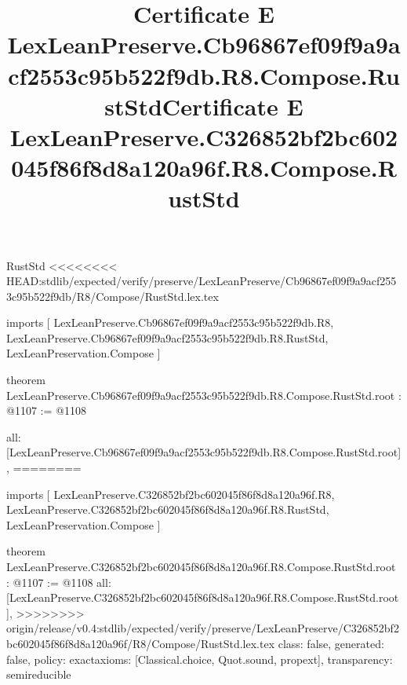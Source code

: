 \begin{lexlean}{RustStd}
<<<<<<<< HEAD:stdlib/expected/verify/preserve/LexLeanPreserve/Cb96867ef09f9a9acf2553c95b522f9db/R8/Compose/RustStd.lex.tex
\title{Certificate E LexLeanPreserve.Cb96867ef09f9a9acf2553c95b522f9db.R8.Compose.RustStd}
\begin{coremodule}
imports [
  LexLeanPreserve.Cb96867ef09f9a9acf2553c95b522f9db.R8,
  LexLeanPreserve.Cb96867ef09f9a9acf2553c95b522f9db.R8.RustStd,
  LexLeanPreservation.Compose
]

theorem LexLeanPreserve.Cb96867ef09f9a9acf2553c95b522f9db.R8.Compose.RustStd.root : @1107 := @1108 {
  all: [LexLeanPreserve.Cb96867ef09f9a9acf2553c95b522f9db.R8.Compose.RustStd.root],
========
\title{Certificate E LexLeanPreserve.C326852bf2bc602045f86f8d8a120a96f.R8.Compose.RustStd}
\begin{coremodule}
imports [
  LexLeanPreserve.C326852bf2bc602045f86f8d8a120a96f.R8,
  LexLeanPreserve.C326852bf2bc602045f86f8d8a120a96f.R8.RustStd,
  LexLeanPreservation.Compose
]

theorem LexLeanPreserve.C326852bf2bc602045f86f8d8a120a96f.R8.Compose.RustStd.root : @1107 := @1108 {
  all: [LexLeanPreserve.C326852bf2bc602045f86f8d8a120a96f.R8.Compose.RustStd.root],
>>>>>>>> origin/release/v0.4:stdlib/expected/verify/preserve/LexLeanPreserve/C326852bf2bc602045f86f8d8a120a96f/R8/Compose/RustStd.lex.tex
  class: false,
  generated: false,
  policy: exact{axioms: [Classical.choice, Quot.sound, propext]},
  transparency: semireducible
}


\end{coremodule}}
\end{coremodule}
\end{lexlean}
